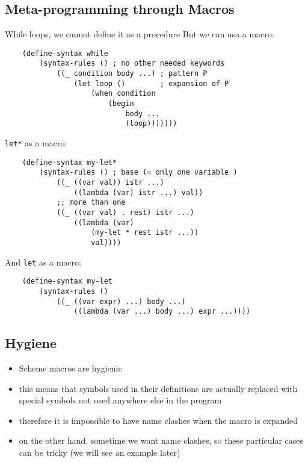 \subsection{Meta-programming through Macros}
While loops, we cannot define it as a procedure
But we can usa a macro:
\begin{lstlisting}
    (define-syntax while
        (syntax-rules () ; no other needed keywords
            ((_ condition body ...) ; pattern P
                (let loop ()        ; expansion of P
                    (when condition
                        (begin
                            body ...
                            (loop)))))))
\end{lstlisting}
\texttt{let*} as a macro:
\begin{lstlisting}
    (define-syntax my-let*
        (syntax-rules () ; base (= only one variable )
            ((_ ((var val)) istr ...)
                ((lambda (var) istr ...) val))
            ;; more than one
            ((_ ((var val) . rest) istr ...)
                ((lambda (var)
                    (my-let * rest istr ...))
                    val))))
\end{lstlisting}
And \texttt{let} as a macro:
\begin{lstlisting}
    (define-syntax my-let
        (syntax-rules ()
            ((_ ((var expr) ...) body ...)
                ((lambda (var ...) body ...) expr ...))))
\end{lstlisting}
\subsection{Hygiene}
\begin{itemize}
    \item Scheme macros are hygienic
    \item this means that symbols used in their definitions are actually replaced with special symbols not used anywhere else in the program
    \item therefore it is impossible to have name clashes when the macro is expanded
    \item on the other hand, sometime we want name clashes, so these particular cases can be tricky (we will see an example later)
\end{itemize}

    
